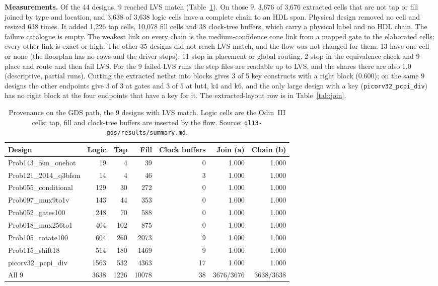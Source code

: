 \documentclass[conference]{IEEEtran}
\newcommand{\hev}[1]{\par\smallskip\noindent\textbf{#1}}
\newcommand{\code}[1]{\texttt{#1}}
\begin{document}
\hev{Measurements.} Of the 44 designs, 9 reached LVS match (Table~\ref{tab:gds}). On those 9, 3,676 of 3,676 extracted cells that are not tap or fill joined by type and location, and 3,638 of 3,638 logic cells have a complete chain to an HDL span. Physical design removed no cell and resized 638 times. It added 1,226 tap cells, 10,078 fill cells and 38 clock-tree buffers, which carry a physical label and no HDL chain. The failure catalogue is empty. The weakest link on every chain is the medium-confidence cone link from a mapped gate to the elaborated cells; every other link is exact or high. The other 35 designs did not reach LVS match, and the flow was not changed for them: 13 have one cell or none (the floorplan has no rows and the driver stops), 11 stop in placement or global routing, 2 stop in the equivalence check and 9 place and route and then fail LVS. For the 9 failed-LVS runs the step files are readable up to LVS, and the shares there are also 1.0 (descriptive, partial runs). Cutting the extracted netlist into blocks gives 3 of 5 key constructs with a right block (0.600); on the same 9 designs the other endpoints give 3 of 3 at gates and 3 of 5 at lut4, k4 and k6, and the only large design with a key (\code{picorv32\_pcpi\_div}) has no right block at the four endpoints that have a key for it. The extracted-layout row is in Table~\ref{tab:join}.

\begin{table}[t]
\caption{Provenance on the GDS path, the 9 designs with LVS match. Logic cells are the Odin~III cells; tap, fill and clock-tree buffers are inserted by the flow. Source: \code{ql13-gds/results/summary.md}.}
\label{tab:gds}
\centering
\footnotesize
\begin{tabular}{@{}lrrrrrr@{}}
\toprule
Design & Logic & Tap & Fill & Clock buffers & Join (a) & Chain (b) \\
\midrule
Prob143\_fsm\_onehot & 19 & 4 & 39 & 0 & 1.000 & 1.000 \\
Prob121\_2014\_q3bfsm & 14 & 4 & 46 & 3 & 1.000 & 1.000 \\
Prob055\_conditional & 129 & 30 & 272 & 0 & 1.000 & 1.000 \\
Prob097\_mux9to1v & 143 & 44 & 353 & 0 & 1.000 & 1.000 \\
Prob052\_gates100 & 248 & 70 & 588 & 0 & 1.000 & 1.000 \\
Prob018\_mux256to1 & 404 & 102 & 875 & 0 & 1.000 & 1.000 \\
Prob105\_rotate100 & 604 & 260 & 2073 & 9 & 1.000 & 1.000 \\
Prob115\_shift18 & 514 & 180 & 1469 & 9 & 1.000 & 1.000 \\
picorv32\_pcpi\_div & 1563 & 532 & 4363 & 17 & 1.000 & 1.000 \\
\midrule
All 9 & 3638 & 1226 & 10078 & 38 & 3676/3676 & 3638/3638 \\
\bottomrule
\end{tabular}
\end{table}
\end{document}
